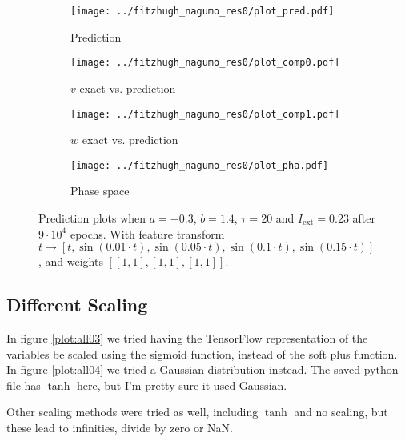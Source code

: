 \documentclass[a4paper]{article}
\begin{document}
\begin{figure}[H]
	\centering 
	\begin{subfigure}[b]{0.47\textwidth}
		\centering
		\texttt{[image: ../fitzhugh\_nagumo\_res0/plot\_pred.pdf]}
		\caption{Prediction}
		\label{fig:all02a}
	\end{subfigure}
	\begin{subfigure}[b]{0.47\textwidth}
		\centering
		\texttt{[image: ../fitzhugh\_nagumo\_res0/plot\_comp0.pdf]}
		\caption{$v$ exact vs. prediction}
		\label{fig:all02b}
	\end{subfigure}
	\begin{subfigure}[b]{0.47\textwidth}
		\centering
		\texttt{[image: ../fitzhugh\_nagumo\_res0/plot\_comp1.pdf]}
		\caption{$w$ exact vs. prediction}
		\label{fig:all02c}
	\end{subfigure}
	\begin{subfigure}[b]{0.47\textwidth}
		\centering
		\texttt{[image: ../fitzhugh\_nagumo\_res0/plot\_pha.pdf]}
		\caption{Phase space}
		\label{fig:all02d}
	\end{subfigure}
	\caption{Prediction plots when $a=-0.3$, $b=1.4$, $\tau=20$ and $ I_{\text{ext}}=0.23$ after $9\cdot10^4$ epochs. With feature transform $t \rightarrow \left[ t, \sin(0.01 \cdot  t), \sin(0.05 \cdot  t), \sin(0.1 \cdot  t), \sin(0.15 \cdot  t)\right] $, and weights $\left[ \left[ 1, 1\right], \left[ 1, 1\right], \left[ 1, 1\right]\right]$.}
	\label{plot:all02}
\end{figure}



\subsection{Different Scaling}

In figure \ref{plot:all03} we tried having the TensorFlow representation of the variables be scaled using the sigmoid function, instead of the soft plus function. In figure \ref{plot:all04} we tried a Gaussian distribution instead. The saved python file has $\tanh$ here, but I'm pretty sure it used Gaussian.

Other scaling methods were tried as well, including $\tanh$ and no scaling, but these lead to infinities, divide by zero or NaN. 
\end{document}
